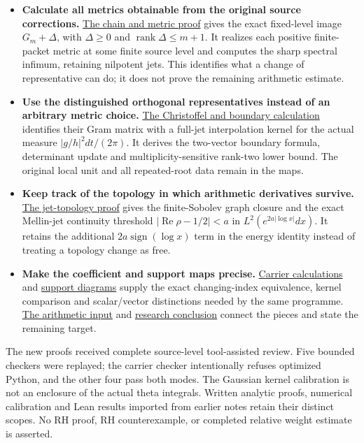 \documentclass[
]{article}
\providecommand{\tightlist}{%
  \setlength{\itemsep}{0pt}\setlength{\parskip}{0pt}}
\begin{document}
\begin{itemize}
\tightlist
\item
  \textbf{Calculate all metrics obtainable from the original source
  corrections.} \href{tex/tau_chain.tex}{The chain and metric proof}
  gives the exact fixed-level image \(G_m+\Delta\), with \(\Delta\geq0\)
  and \(\operatorname{rank}\Delta\leq m+1\). It realizes each positive
  finite-packet metric at some finite source level and computes the
  sharp spectral infimum, retaining nilpotent jets. This identifies what
  a change of representative can do; it does not prove the remaining
  arithmetic estimate.
\item
  \textbf{Use the distinguished orthogonal representatives instead of an
  arbitrary metric choice.} \href{tex/tau_boundary.tex}{The Christoffel
  and boundary calculation} identifies their Gram matrix with a full-jet
  interpolation kernel for the actual measure \(|g/h|^2dt/(2\pi)\). It
  derives the two-vector boundary formula, determinant update and
  multiplicity-sensitive rank-two lower bound. The original local unit
  and all repeated-root data remain in the maps.
\item
  \textbf{Keep track of the topology in which arithmetic derivatives
  survive.} \href{tex/jet_topology.tex}{The jet-topology proof} gives
  the finite-Sobolev graph closure and the exact Mellin-jet continuity
  threshold \(|\operatorname{Re}\rho-1/2|<a\) in
  \(L^2(e^{2a|\log x|}dx)\). It retains the additional
  \(2a\operatorname{sign}(\log x)\) term in the energy identity instead
  of treating a topology change as free.
\item
  \textbf{Make the coefficient and support maps precise.}
  \href{tex/split_zero_carriers.tex}{Carrier calculations} and
  \href{tex/support_diagrams.tex}{support diagrams} supply the exact
  changing-index equivalence, kernel comparison and scalar/vector
  distinctions needed by the same programme.
  \href{tex/arithmetic_input.tex}{The arithmetic input} and
  \href{tex/research_conclusion.tex}{research conclusion} connect the
  pieces and state the remaining target.
\end{itemize}

The new proofs received complete source-level tool-assisted review. Five
bounded checkers were replayed; the carrier checker intentionally
refuses optimized Python, and the other four pass both modes. The
Gaussian kernel calibration is not an enclosure of the actual theta
integrals. Written analytic proofs, numerical calibration and Lean
results imported from earlier notes retain their distinct scopes. No RH
proof, RH counterexample, or completed relative weight estimate is
asserted.
\end{document}
